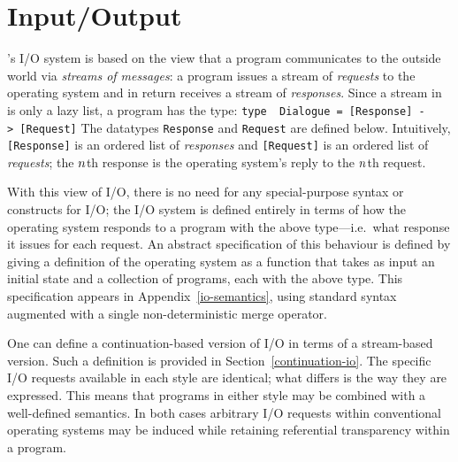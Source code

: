 %
%
\section{Input/Output}
\label{io}

\Haskell{}'s I/O system is based on the view that a program
communicates to the outside world via {\em streams of messages}:
a program issues a stream of {\em requests} to the
operating system and in return receives a stream of {\em responses}.
Since a stream in \Haskell{} is only a lazy list,
a \Haskell{} program has the type:
\bprog
\mbox{\tt type\ \ Dialogue\ =\ [Response]\ ->\ [Request]}
\eprog{}%
The datatypes \mbox{\tt Response} and
\mbox{\tt Request} are defined below.  Intuitively,
\mbox{\tt [Response]} is an ordered list of {\em responses} and \mbox{\tt [Request]} is
an ordered list of {\em requests}; the $n\/$th response is the
operating system's reply to the $n\/$th request.

With this view of I/O, there is no need for any special-purpose
syntax or constructs for I/O; the I/O system is defined
entirely in terms of how the operating system responds to a program
with the above type---i.e.~what response it issues for each request.
An abstract specification of this behaviour is defined by
giving a definition of the operating system as a function that takes
as input an initial state and a collection of \Haskell{} programs,
each with the above type.  This specification appears in
Appendix~\ref{io-semantics}, using standard \Haskell{} syntax
augmented with a single non-deterministic merge operator.

One can
define a continuation-based
version of I/O in terms of a stream-based version.  Such a definition
is provided in Section~\ref{continuation-io}.
The specific I/O requests available in each style are identical;
what differs is the way they are expressed.  This means that programs
in either style may be combined with a well-defined semantics.  In
both cases arbitrary I/O requests within conventional operating
systems may be induced while retaining referential transparency within
a \Haskell{} program.

